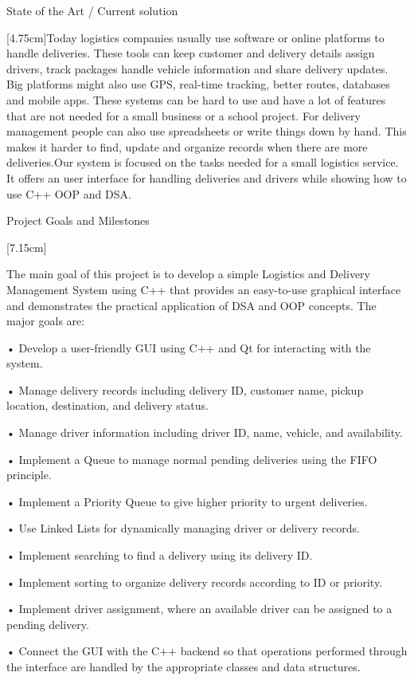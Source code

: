 \documentclass[11pt,a4paper]{article}
\newcommand{\blueheading}[1]{%
    {\sffamily\color{TitleBlue}\fontsize{15}{18}\selectfont #1}%
}
\newcommand{\instruction}[1]{%
    {\itshape\fontsize{10.5}{12.5}\selectfont #1}%
}
\newcommand{\answerbox}[2][3.0cm]{%
    \vspace{2pt}
    \noindent
    \fbox{%
        \begin{minipage}[t][#1][t]{\dimexpr\textwidth-2\fboxsep-2\fboxrule\relax}
            \vspace{1mm}
            \itshape #2
        \end{minipage}
    }
}
\begin{document}
\vspace{12mm}

\blueheading{State of the Art / Current solution }

\vspace{1mm}

\instruction

\answerbox[4.75cm]{Today logistics companies usually use software or online platforms to handle deliveries. These tools can keep customer and delivery details assign drivers, track packages handle vehicle information and share delivery updates. Big platforms might also use GPS, real-time tracking, better routes, databases and mobile apps. These systems can be hard to use and have a lot of features that are not needed for a small business or a school project. For delivery management people can also use spreadsheets or write things down by hand. This makes it harder to find, update and organize records when there are more deliveries.Our system is focused on the tasks needed for a small logistics service. It offers an user interface for handling deliveries and drivers while showing how to use C++ OOP and DSA. }

\vspace{12mm}

\blueheading{Project Goals and Milestones }

\vspace{1mm}

\instruction

\answerbox[7.15cm]{The main goal of this project is to develop a simple Logistics and Delivery Management System using C++ that provides an easy-to-use graphical interface and demonstrates the practical application of DSA and OOP concepts.
The major goals are:

•	Develop a user-friendly GUI using C++ and Qt for interacting with the system.

•	Manage delivery records including delivery ID, customer name, pickup location, destination, and delivery status.

•	Manage driver information including driver ID, name, vehicle, and availability.

•	Implement a Queue to manage normal pending deliveries using the FIFO principle.

•	Implement a Priority Queue to give higher priority to urgent deliveries.

•	Use Linked Lists for dynamically managing driver or delivery records.

•	Implement searching to find a delivery using its delivery ID.

•	Implement sorting to organize delivery records according to ID or priority.

•	Implement driver assignment, where an available driver can be assigned to a pending delivery.

•	Connect the GUI with the C++ backend so that operations performed through the interface are handled by the appropriate classes and data structures.
}
\end{document}
